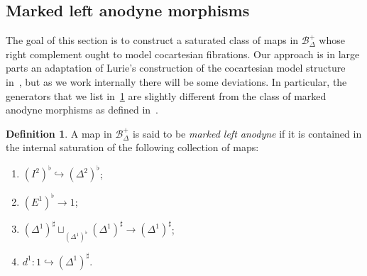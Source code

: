 \documentclass[reqno]{amsart}
\numberwithin{equation}{subsection}
\theoremstyle{plain}
\theoremstyle{definition}
\newtheorem{definition}[equation]{Definition}
\let\scr=\mathcal
\let\into=\hookrightarrow
\def\BB{\scr B}
\newcommand{\mSimp}[1]{#1_{\Delta}^+}
\begin{document}
\subsection{Marked left anodyne morphisms}
\label{sec:markedAnodyne}
The goal of this section is to construct a saturated class of maps in $\mSimp\BB$ whose right complement ought to model cocartesian fibrations. Our approach is in large parts an adaptation of Lurie's construction of the cocartesian model structure in~\cite[\S~3.1]{htt}, but as we work internally there will be some deviations. In particular, the generators that we list in~\ref{def:markedAnodyne} are slightly different from the class of marked anodyne morphisms as defined in~\cite[Definition~3.1.1.1]{htt}.
\begin{definition}
\label{def:markedAnodyne}
	A map in $\mSimp{\BB}$ is said to be \emph{marked left anodyne} if it is contained in the internal saturation of the following collection of maps:
	\begin{enumerate}
	\item $(I^2)^\flat\into(\Delta^2)^\flat$;
	\item $(E^1)^\flat\to 1$;
	\item $(\Delta^1)^\sharp\sqcup_{(\Delta^1)^\flat}(\Delta^1)^\sharp\to (\Delta^1)^\sharp$;
	\item $d^1\colon 1\into(\Delta^1)^\sharp$.
\end{enumerate}
\end{definition}
\end{document}
